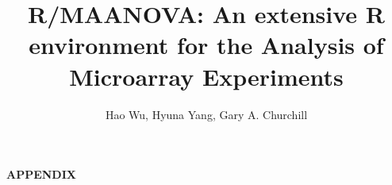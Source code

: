 \documentclass[12pt]{article}
\author{Hao Wu, Hyuna Yang, Gary A. Churchill}
\begin{document}
\title{R/MAANOVA: An extensive R environment for the Analysis of Microarray Experiments}

\maketitle
\tableofcontents










\nocite{benjamin:1995}
\nocite{benjamin:2001}
\nocite{churchill:2002}
\nocite{cui:2003a}
\nocite{cui:2003b}
\nocite{cui:2005}
\nocite{felsenstein:1985}
\nocite{Kerr:2001a}
\nocite{kerr:2001b}
\nocite{kerr:2001c}
\nocite{kerr:2000}
\nocite{kerr:2002}
\nocite{littell:1996}
\nocite{margush:1981}
\nocite{mclean:1991}
\nocite{prichard:2001}
\nocite{witk:2001}
\nocite{wolfinger:2001}
\nocite{yang:2002}
\nocite{searle:1992}
\nocite{sas:1999}

\newpage
\begin{center}
{\large\bf APPENDIX}
\end{center}

\begin{appendix}
%



\end{appendix}
\end{document}
